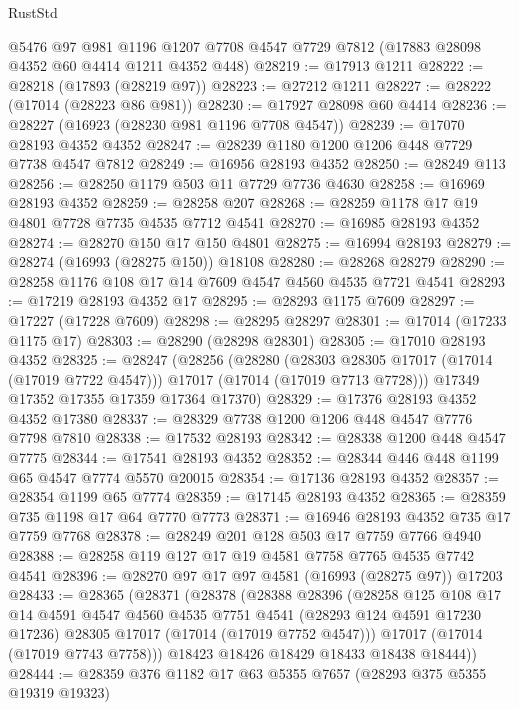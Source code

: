 \begin{lexlean}{RustStd}
\begin{coremodule}
{\begin{coremodule}
{{{{{{{{{{{{{{{{{{{{{{{{{{{{{{{{{{{{{{{{{{{{{{{{{{{{{{{    @5476
    @97
    @981
    @1196
    @1207
    @7708
    @4547
    @7729
    @7812
    (@17883 @28098 @4352 @60 @4414 @1211 @4352 @448)
@28219 := @17913 @1211
@28222 := @28218 (@17893 (@28219 @97))
@28223 := @27212 @1211
@28227 := @28222 (@17014 (@28223 @86 @981))
@28230 := @17927 @28098 @60 @4414
@28236 := @28227 (@16923 (@28230 @981 @1196 @7708 @4547))
@28239 := @17070 @28193 @4352 @4352
@28247 := @28239 @1180 @1200 @1206 @448 @7729 @7738 @4547 @7812
@28249 := @16956 @28193 @4352
@28250 := @28249 @113
@28256 := @28250 @1179 @503 @11 @7729 @7736 @4630
@28258 := @16969 @28193 @4352
@28259 := @28258 @207
@28268 := @28259 @1178 @17 @19 @4801 @7728 @7735 @4535 @7712 @4541
@28270 := @16985 @28193 @4352
@28274 := @28270 @150 @17 @150 @4801
@28275 := @16994 @28193
@28279 := @28274 (@16993 (@28275 @150)) @18108
@28280 := @28268 @28279
@28290 := @28258 @1176 @108 @17 @14 @7609 @4547 @4560 @4535 @7721 @4541
@28293 := @17219 @28193 @4352 @17
@28295 := @28293 @1175 @7609
@28297 := @17227 (@17228 @7609)
@28298 := @28295 @28297
@28301 := @17014 (@17233 @1175 @17)
@28303 := @28290 (@28298 @28301)
@28305 := @17010 @28193 @4352
@28325 := @28247
    (@28256
      (@28280
        (@28303 @28305 @17017 (@17014 (@17019 @7722 @4547)))
        @17017
        (@17014 (@17019 @7713 @7728)))
      @17349
      @17352
      @17355
      @17359
      @17364
      @17370)
@28329 := @17376 @28193 @4352 @4352 @17380
@28337 := @28329 @7738 @1200 @1206 @448 @4547 @7776 @7798 @7810
@28338 := @17532 @28193
@28342 := @28338 @1200 @448 @4547 @7775
@28344 := @17541 @28193 @4352
@28352 := @28344 @446 @448 @1199 @65 @4547 @7774 @5570 @20015
@28354 := @17136 @28193 @4352
@28357 := @28354 @1199 @65 @7774
@28359 := @17145 @28193 @4352
@28365 := @28359 @735 @1198 @17 @64 @7770 @7773
@28371 := @16946 @28193 @4352 @735 @17 @7759 @7768
@28378 := @28249 @201 @128 @503 @17 @7759 @7766 @4940
@28388 := @28258 @119 @127 @17 @19 @4581 @7758 @7765 @4535 @7742 @4541
@28396 := @28270 @97 @17 @97 @4581 (@16993 (@28275 @97)) @17203
@28433 := @28365
    (@28371
      (@28378
        (@28388
          @28396
          (@28258
            @125
            @108
            @17
            @14
            @4591
            @4547
            @4560
            @4535
            @7751
            @4541
            (@28293 @124 @4591 @17230 @17236)
            @28305
            @17017
            (@17014 (@17019 @7752 @4547)))
          @17017
          (@17014 (@17019 @7743 @7758)))
        @18423
        @18426
        @18429
        @18433
        @18438
        @18444))
@28444 := @28359 @376 @1182 @17 @63 @5355 @7657 (@28293 @375 @5355 @19319 @19323)
}}}}}}}}}}}}}}}}}}}}}}}}}}}}}}}}}}}}}}}}}}}}}}}}}}}}}}}
\end{coremodule}}
\end{coremodule}
\end{lexlean}
